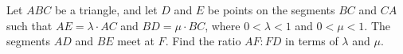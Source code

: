 Let $ABC$ be a triangle, and let $D$ and $E$ be points on the segments $BC$ and $CA$ such that $AE=\lambda\cdot AC$ and $BD=\mu\cdot BC$, where $0<\lambda<1$ and $0<\mu<1$. The segments $AD$ and $BE$ meet at $F$. Find the ratio $AF:FD$ in terms of $\lambda$ and $\mu$.

